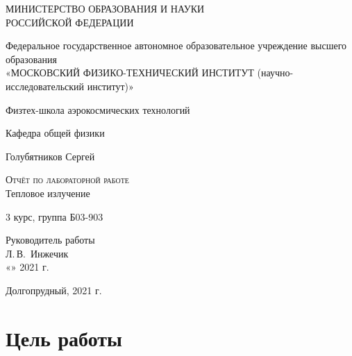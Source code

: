 \documentclass[14pt,a4paper]{scrartcl}
\begin{document}
\begin{titlepage}
  \begin{center}
    \large
    МИНИСТЕРСТВО ОБРАЗОВАНИЯ И НАУКИ\\ РОССИЙСКОЙ ФЕДЕРАЦИИ
     
    \vspace{0.5cm}
 
    Федеральное государственное автономное образовательное учреждение высшего образования \\ «МОСКОВСКИЙ ФИЗИКО-ТЕХНИЧЕСКИЙ ИНСТИТУТ (научно-исследовательский институт)»
    \vspace{0.25cm}

	Физтех-школа аэрокосмических технологий
     
    Кафедра общей физики
    \vfill
     
     

    Голубятников Сергей
    \vfill
 
    \textsc{Отчёт по лабораторной работе}\\[5mm]
     
    {\LARGE Тепловое излучение}
  \bigskip
     
   3 курс, группа Б03-903
\end{center}
\vfill
 
\newlength{\ML}
\hfill
\begin{minipage}{0.4\textwidth}
  Руководитель работы\\
  \underline{\hspace{\ML}} Л.\,В.~Инжечик\\
  «\underline{\hspace{0.7cm}}» \underline{\hspace{2cm}} 2021 г.
\end{minipage}%
\bigskip
 

\vfill
 
\begin{center}
  Долгопрудный, 2021 г.
\end{center}
\end{titlepage}


\tableofcontents
{}
\newpage


\section{Цель работы}
\end{document}
